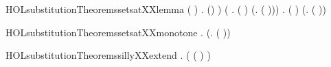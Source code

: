 \begin{SaveVerbatim}{HOLsubstitutionTheoremssetsatXXlemma}
        (  )  \HOLSymConst{=}
      \HOLTokenLeftbrace{} \HOLTokenBar{}
       \HOLSymConst{\HOLTokenExists{}} .
             \HOLSymConst{\HOLTokenConj{}}  \HOLConst{\HOLTokenIn{}}  \HOLSymConst{\HOLTokenConj{}} (\HOLSymConst{,}\HOLSymConst{,})  \HOLTokenRightbrace{}) \HOLSymConst{\HOLTokenConj{}}
   (\HOLSymConst{\HOLTokenForall{}}  .
        (  )  \HOLSymConst{=}
       (\HOLTokenLambda{}.    (   ))) \HOLSymConst{\HOLTokenConj{}}
   \HOLSymConst{\HOLTokenForall{}}  .
       (  )  \HOLSymConst{=}
      (\HOLTokenLambda{}.    (   ))
\end{SaveVerbatim}
\newcommand{\HOLsubstitutionTheoremssetsatXXlemma}{\UseVerbatim{HOLsubstitutionTheoremssetsatXXlemma}}
\begin{SaveVerbatim}{HOLsubstitutionTheoremssetsatXXmonotone}
\HOLTokenTurnstile{} \HOLSymConst{\HOLTokenForall{}}   .
      (\HOLTokenLambda{}.    (   ))
\end{SaveVerbatim}
\newcommand{\HOLsubstitutionTheoremssetsatXXmonotone}{\UseVerbatim{HOLsubstitutionTheoremssetsatXXmonotone}}
\begin{SaveVerbatim}{HOLsubstitutionTheoremssillyXXextend}
\HOLTokenTurnstile{} \HOLSymConst{\HOLTokenForall{}}    .
      \HOLConst{\HOLTokenNotIn{}}   \HOLSymConst{\HOLTokenImp{}}
     (   (   ) \HOLSymConst{=}    )
\end{SaveVerbatim}
